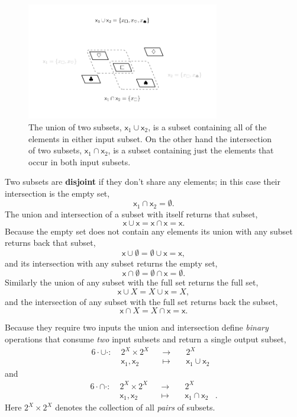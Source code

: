 \documentclass[
  letterpaper,
  DIV=11,
  numbers=noendperiod]{scrartcl}
\begin{document}
\begin{figure}

{\centering \includegraphics[width=0.75\textwidth,height=\textheight]{figures/overlapping_subsets_ui/overlapping_subsets_ui.pdf}

}

\caption{\label{fig-ui}The union of two subsets,
\(\mathsf{x}_1 \cup \mathsf{x}_2\), is a subset containing all of the
elements in either input subset. On the other hand the intersection of
two subsets, \(\mathsf{x}_1 \cap \mathsf{x}_2\), is a subset containing
just the elements that occur in both input subsets.}

\end{figure}

Two subsets are \textbf{disjoint} if they don't share any elements; in
this case their intersection is the empty set, \[
\mathsf{x}_{1} \cap \mathsf{x}_{2} = \emptyset.
\] The union and intersection of a subset with itself returns that
subset, \[
\mathsf{x} \cup \mathsf{x} = \mathsf{x} \cap \mathsf{x} = \mathsf{x}.
\] Because the empty set does not contain any elements its union with
any subset returns back that subset, \[
\mathsf{x} \cup \emptyset = \emptyset \cup \mathsf{x} = \mathsf{x},
\] and its intersection with any subset returns the empty set, \[
\mathsf{x} \cap \emptyset = \emptyset \cap \mathsf{x} = \emptyset.
\] Similarly the union of any subset with the full set returns the full
set, \[
\mathsf{x} \cup X = X \cup \mathsf{x} = X,
\] and the intersection of any subset with the full set returns back the
subset, \[
\mathsf{x} \cap X = X \cap \mathsf{x} = \mathsf{x}.
\]

Because they require two inputs the union and intersection define
\emph{binary} operations that consume \emph{two} input subsets and
return a single output subset, \begin{alignat*}{6}
\cdot \cup \cdot :\; & 2^{X} \times 2^{X}& &\rightarrow& \; & 2^{X} &
\\
& \mathsf{x}_1, \mathsf{x}_{2} & &\mapsto& & \mathsf{x}_1 \cup \mathsf{x}_2 &
\end{alignat*} and \begin{alignat*}{6}
\cdot \cap \cdot :\; & 2^{X} \times 2^{X}& &\rightarrow& \; & 2^{X} &
\\
& \mathsf{x}_1, \mathsf{x}_{2} & &\mapsto& & \mathsf{x}_1 \cap \mathsf{x}_2 &.
\end{alignat*} Here \(2^{X} \times 2^{X}\) denotes the collection of all
\emph{pairs} of subsets.
\end{document}

